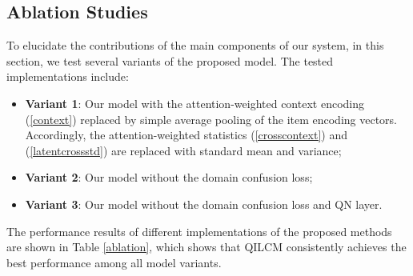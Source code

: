 \documentclass[letterpaper]{article} %
\begin{document}
\subsection{Ablation Studies}

To elucidate the contributions of the main components of our system, in this section, we test several variants of the proposed model. The tested implementations include:
\begin{itemize}
	\item \textbf{Variant 1}: Our model with the attention-weighted context encoding (\ref{context}) replaced by simple average pooling of the item encoding vectors. Accordingly, the attention-weighted statistics (\ref{crosscontext}) and (\ref{latentcrossstd}) are replaced with standard mean and variance;
	\item \textbf{Variant 2}: Our model without the domain confusion loss;
	\item \textbf{Variant 3}: Our model without the domain confusion loss and QN layer.
\end{itemize}
The performance results of different implementations of the proposed methods are shown in Table \ref{ablation}, which shows that QILCM consistently achieves the best performance among all model variants.
\end{document}
